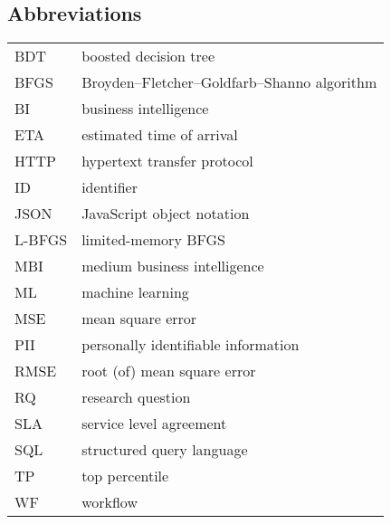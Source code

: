 \subsection*{Abbreviations}

\begin{tabular}{ll}
BDT         & boosted decision tree \\
BFGS        & Broyden–Fletcher–Goldfarb–Shanno algorithm \\
BI          & business intelligence \\
ETA         & estimated time of arrival \\
HTTP        & hypertext transfer protocol \\
ID          & identifier \\
JSON        & JavaScript object notation \\
L-BFGS      & limited-memory BFGS \\
MBI         & medium business intelligence \\
ML          & machine learning \\
MSE         & mean square error \\
PII         & personally identifiable information \\
RMSE        & root (of) mean square error \\
RQ          & research question \\
SLA         & service level agreement \\
SQL         & structured query language \\
TP          & top percentile \\
WF          & workflow \\
\end{tabular}
